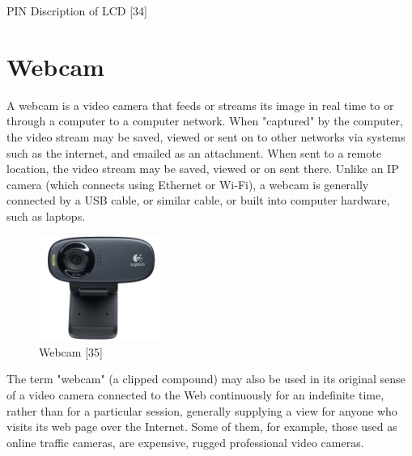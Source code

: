 \documentclass[twoside,a4paper,16pt]{book}
\begin{document}
{{\begin{table}[!ht]
	
	\caption{PIN Discription of LCD [34]}
\end{table}



\section{Webcam }
A webcam is a video camera that feeds or streams its image in real time to or through a computer to a computer network. When "captured" by the computer, the video stream may be saved, viewed or sent on to other networks via systems such as the internet, and emailed as an attachment. When sent to a remote location, the video stream may be saved, viewed or on sent there. Unlike an IP camera (which connects using Ethernet or Wi-Fi), a webcam is generally connected by a USB cable, or similar cable, or built into computer hardware, such as laptops.
\begin{figure}[ht!]
	\begin{center}
		\includegraphics[width=4.0cm]{19.png}
		\caption{Webcam [35]}
	\end{center}
\end{figure}

The term "webcam" (a clipped compound) may also be used in its original sense of a video camera connected to the Web continuously for an indefinite time, rather than for a particular session, generally supplying a view for anyone who visits its web page over the Internet. Some of them, for example, those used as online traffic cameras, are expensive, rugged professional video cameras.

}}
\end{document}
